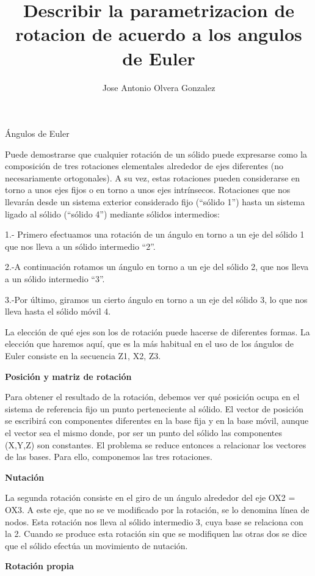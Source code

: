 \documentclass[12pt,letterpaper]{report}
\author{Jose Antonio Olvera Gonzalez }
\title{Describir la parametrizacion de rotacion de acuerdo a los angulos de Euler }
\begin{document}
\begin{center}
Ángulos de Euler
\begin{flushleft}
Puede demostrarse que cualquier rotación de un sólido puede expresarse como la composición de tres rotaciones elementales alrededor de ejes diferentes (no necesariamente ortogonales). A su vez, estas rotaciones pueden considerarse en torno a unos ejes fijos o en torno a unos ejes intrínsecos. Rotaciones que nos llevarán desde un sistema exterior considerado fijo (“sólido 1”) hasta un sistema ligado al sólido (“sólido 4”) mediante sólidos intermedios:
\begin{flushleft}
1.- Primero efectuamos una rotación de un ángulo  en torno a un eje del sólido 1 que nos lleva a un sólido intermedio “2”.
\begin{flushleft}
2.-A continuación rotamos un ángulo  en torno a un eje del sólido 2, que nos lleva a un sólido intermedio “3”.
\begin{flushleft}
3.-Por último, giramos un cierto ángulo  en torno a un eje del sólido 3, lo que nos lleva hasta el sólido móvil 4.
\begin{flushleft}
La elección de qué ejes son los de rotación puede hacerse de diferentes formas. La elección que haremos aquí, que es la más habitual en el uso de los ángulos de Euler consiste en la secuencia Z1, X2, Z3.
\begin{flushleft}
\textbf{Posición y matriz de rotación}
\begin{flushleft}
Para obtener el resultado de la rotación, debemos ver qué posición ocupa en el sistema de referencia fijo un punto perteneciente al sólido. El vector de posición se escribirá con componentes diferentes en la base fija y en la base móvil, aunque el vector sea el mismo donde, por ser un punto del sólido las componentes (X,Y,Z) son constantes. El problema se reduce entonces a relacionar los vectores de las bases. Para ello, componemos las tres rotaciones.
\begin{flushleft}
\textbf{Nutación}
\begin{flushleft}
La segunda rotación consiste en el giro de un ángulo  alrededor del eje OX2 = OX3. A este eje, que no se ve modificado por la rotación, se lo denomina línea de nodos. Esta rotación nos lleva al sólido intermedio 3, cuya base se relaciona con la 2. Cuando se produce esta rotación sin que se modifiquen las otras dos se dice que el sólido efectúa un movimiento de nutación.
\begin{flushleft}
\textbf{Rotación propia}
\begin{flushleft}

\end{flushleft}
\end{flushleft}
\end{flushleft}
\end{flushleft}
\end{flushleft}
\end{flushleft}
\end{flushleft}
\end{flushleft}
\end{flushleft}
\end{flushleft}
\end{flushleft}
\end{center}
\end{document}
